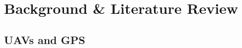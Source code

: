 \documentclass[aspectratio=169, 8pt]{beamer}
\begin{document}

















\section{Background \& Literature Review}

\subsection{UAVs and GPS}
\end{document}
